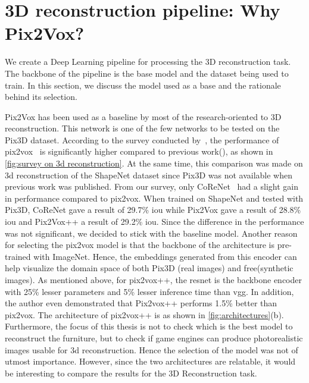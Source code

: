 \section{3D reconstruction pipeline: Why Pix2Vox?}\label{sec:3D reconstruction pipeline}
We create a Deep Learning pipeline for processing the 3D reconstruction task.
The backbone of the pipeline is the base model and the dataset being used to train.
In this section, we discuss the model used as a base and the rationale behind its selection.

Pix2Vox has been used as a baseline by most of the research-oriented to 3D reconstruction.
This network is one of the few networks to be tested on the Pix3D dataset.
According to the survey conducted by~\cite{Han2021ImageBased3O}, the performance of pix2vox~\cite{Xie_2019}
is significantly higher compared to previous work(\cite{DBLP:journals/corr/TulsianiZEM17,tatarchenko2016multiview,richter2018matryoshka,gwak2017weakly,8265323}), as shown in \autoref{fig:survey on 3d reconstruction}.
At the same time, this comparison was made on 3d reconstruction of the ShapeNet dataset since Pix3D was not available when previous work was published.
From our survey, only CoReNet~\cite{popov2020corenet} had a slight gain in performance compared to pix2vox.
When trained on ShapeNet and tested with Pix3D, CoReNet gave a result of 29.7\% \gls{iou} while Pix2Vox gave a result of 28.8\% \gls{iou}  and Pix2Vox++ a result of 29.2\% \gls{iou}\@.
Since the difference in the performance was not significant, we decided to stick with the baseline model.
Another reason for selecting the pix2vox model is that the backbone of the architecture is pre-trained with ImageNet.
Hence, the embeddings generated from this encoder can help visualize the domain space of both Pix3D (real images)  and \gls{free}(synthetic images).
As mentioned above, for pix2vox++, the \gls{resnet} is the backbone encoder with 25\% lesser parameters and 5\% lesser inference time than \gls{vgg}\@.
In addition, the author even demonstrated that Pix2vox++ performs 1.5\% better than pix2vox.
The architecture of pix2vox++ is as shown in \autoref{fig:architectures}(b).
Furthermore, the focus of this thesis is not to check which is the best model to reconstruct the furniture, but to check if game engines can produce photorealistic images usable for 3d reconstruction.
Hence the selection of the model was not of utmost importance.
However, since the two architectures are relatable, it would be interesting to compare the results for the 3D Reconstruction task.

